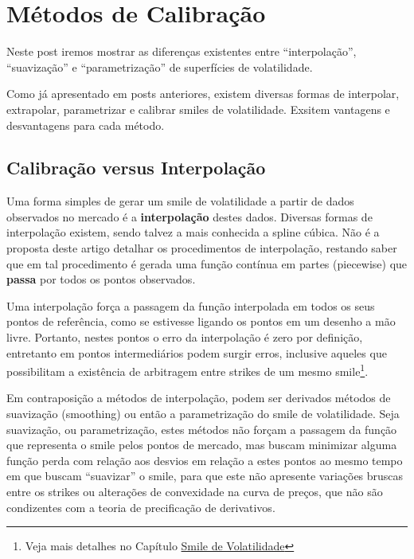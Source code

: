 \documentclass[]{book}
\let\rmarkdownfootnote\footnote%
\def\footnote{\protect\rmarkdownfootnote}
\theoremstyle{definition}
\theoremstyle{definition}
\theoremstyle{definition}
\theoremstyle{remark}
\begin{document}
\hypertarget{calibracao}{%
\chapter{Métodos de Calibração}\label{calibracao}}

Neste post iremos mostrar as diferenças existentes entre ``interpolação'', ``suavização'' e ``parametrização'' de superfícies de volatilidade.

Como já apresentado em posts anteriores, existem diversas formas de interpolar, extrapolar, parametrizar e calibrar smiles de volatilidade. Exsitem vantagens e desvantagens para cada método.

\hypertarget{calibracao-versus-interpolacao}{%
\section{Calibração versus Interpolação}\label{calibracao-versus-interpolacao}}

Uma forma simples de gerar um smile de volatilidade a partir de dados observados no mercado é a \textbf{interpolação} destes dados. Diversas formas de interpolação existem, sendo talvez a mais conhecida a spline cúbica. Não é a proposta deste artigo detalhar os procedimentos de interpolação, restando saber que em tal procedimento é gerada uma função contínua em partes (piecewise) que \textbf{passa} por todos os pontos observados.

Uma interpolação força a passagem da função interpolada em todos os seus pontos de referência, como se estivesse ligando os pontos em um desenho a mão livre. Portanto, nestes pontos o erro da interpolação é zero por definição, entretanto em pontos intermediários podem surgir erros, inclusive aqueles que possibilitam a existência de arbitragem entre strikes de um mesmo smile\footnote{Veja mais detalhes no Capítulo \protect\hyperlink{arbestatica}{Smile de Volatilidade}}.

Em contraposição a métodos de interpolação, podem ser derivados métodos de suavização (smoothing) ou então a parametrização do smile de volatilidade. Seja suavização, ou parametrização, estes métodos não forçam a passagem da função que representa o smile pelos pontos de mercado, mas buscam minimizar alguma função perda com relação aos desvios em relação a estes pontos ao mesmo tempo em que buscam ``suavizar'' o smile, para que este não apresente variações bruscas entre os strikes ou alterações de convexidade na curva de preços, que não são condizentes com a teoria de precificação de derivativos.
\end{document}
